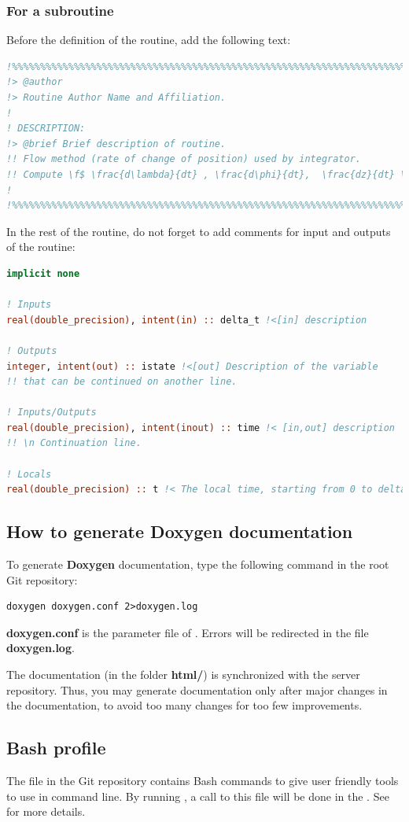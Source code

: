 \documentclass[english,a4paper,twoside]{article}
\begin{document}
\subsubsection{For a subroutine}
Before the definition of the routine, add the following text:
\begin{lstlisting}[language=Fortran]
!%%%%%%%%%%%%%%%%%%%%%%%%%%%%%%%%%%%%%%%%%%%%%%%%%%%%%%%%%%%%%%%%%%%%%%%%%%%
!> @author 
!> Routine Author Name and Affiliation.
!
! DESCRIPTION: 
!> @brief Brief description of routine. 
!! Flow method (rate of change of position) used by integrator.
!! Compute \f$ \frac{d\lambda}{dt} , \frac{d\phi}{dt},  \frac{dz}{dt} \f$ }
!
!%%%%%%%%%%%%%%%%%%%%%%%%%%%%%%%%%%%%%%%%%%%%%%%%%%%%%%%%%%%%%%%%%%%%%%%%%%% 
\end{lstlisting}

In the rest of the routine, do not forget to add comments for input and outputs of the routine: 
\begin{lstlisting}[language=Fortran]
implicit none

! Inputs
real(double_precision), intent(in) :: delta_t !<[in] description

! Outputs
integer, intent(out) :: istate !<[out] Description of the variable
!! that can be continued on another line.

! Inputs/Outputs
real(double_precision), intent(inout) :: time !< [in,out] description
!! \n Continuation line. 

! Locals
real(double_precision) :: t !< The local time, starting from 0 to delta_t
\end{lstlisting}

\subsection{How to generate Doxygen documentation}
To generate \textbf{Doxygen} documentation, type the following command in the root Git repository:
\begin{verbatim}
doxygen doxygen.conf 2>doxygen.log
\end{verbatim}

\textbf{doxygen.conf} is the parameter file of . Errors will be redirected in the file \textbf{doxygen.log}.

\begin{attention}
The documentation (in the folder \textbf{html/}) is synchronized with the server repository. Thus, you may generate documentation only after major changes in the  documentation, to avoid too many changes for too few improvements.
\end{attention}


\subsection{Bash profile}
The file  in the Git repository contains Bash commands to give user friendly tools to use  in command line. By running , a call to this file will be done in the . See  for more details.



\printindex
\end{document}
